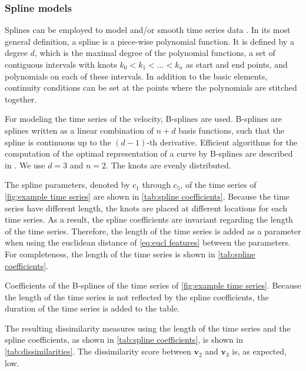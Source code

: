 \documentclass[10pt,final,a4paper,oneside,onecolumn]{article}
\newcommand{\profile}[1]{\textbf{v}_{#1}}
\theoremstyle{plain}\newtheorem{definition}{Definition}[section]    %
\theoremstyle{definition}\newtheorem{example}{Example}[section]     %
\theoremstyle{remark}\newtheorem{remarkenv}{Remark}[section]        %
\begin{document}
\subsubsection{Spline models}
\label{sec:spline models}

Splines can be employed to model and/or smooth time series data \cite{dierckx1993splines, deboor1978practical}. In its most general definition, a spline is a piece-wise polynomial function. It is defined by a degree $d$, which is the maximal degree of the polynomial functions, a set of contiguous intervals with knots $k_0 < k_1 < \ldots < k_n$ as start and end points, and polynomials on each of these intervals. In addition to the basic elements, continuity conditions can be set at the points where the polynomials are stitched together. 

For modeling the time series of the velocity, B-splines are used. B-splines are splines written as a linear combination of $n+d$ basis functions, such that the spline is continuous up to the $(d-1)$-th derivative. Efficient algorithms for the computation of the optimal representation of a curve by B-splines are described in \cite{dierckx1993splines}. We use $d=3$ and $n=2$. The knots are evenly distributed.

The spline parameters, denoted by $c_1$ through $c_5$, of the time series of \cref{fig:example time series} are shown in \cref{tab:spline coefficients}. Because the time series have different length, the knots are placed at different locations for each time series. As a result, the spline coefficients are invariant regarding the length of the time series. Therefore, the length of the time series is added as a parameter when using the euclidean distance of \cref{eq:eucl features} between the parameters. For completeness, the length of the time series is shown in \cref{tab:spline coefficients}. 


\begin{table}
	\centering
	\caption{Coefficients of the B-splines of the time series of \cref{fig:example time series}. Because the length of the time series is not reflected by the spline coefficients, the duration of the time series is added to the table.}
	\label{tab:spline coefficients}
	
\end{table}

The resulting dissimilarity measures using the length of the time series and the spline coefficients, as shown in \cref{tab:spline coefficients}, is shown in \cref{tab:dissimilarities}. The dissimilarity score between $\profile{2}$ and $\profile{3}$ is, as expected, low.
\end{document}
